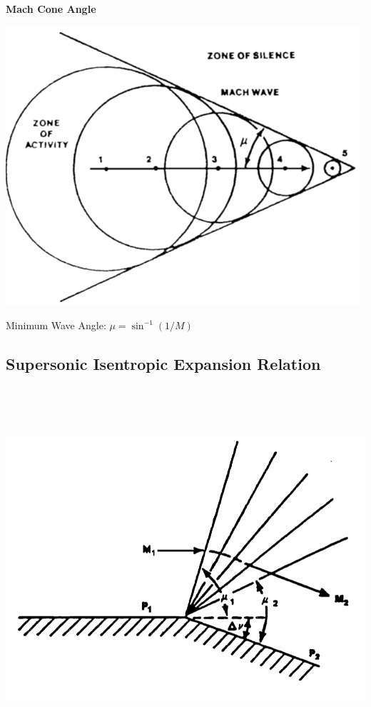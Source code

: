 \documentclass[
]{book}
\begin{document}
\textbf{Mach Cone Angle}

\includegraphics[width=5.163in,height=4.068in]{media/05/image63.png}

Minimum Wave Angle: \(\mu = \sin^{-1}\left(1/M\right)\)

\hypertarget{supersonic-isentropic-expansion-relation}{%
\subsection{Supersonic Isentropic Expansion Relation}\label{supersonic-isentropic-expansion-relation}}

\includegraphics[width=7.2in,height=5.311in]{media/05/image64.png}
\end{document}
